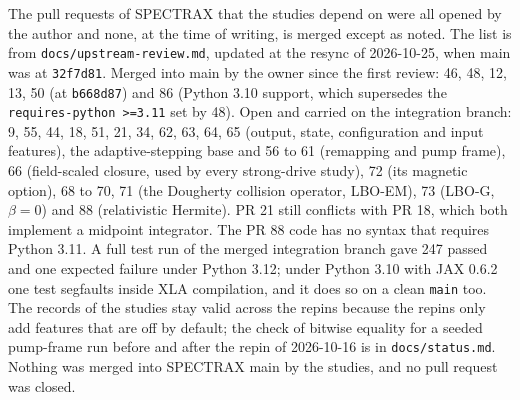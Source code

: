 The pull requests of SPECTRAX that the studies depend on were all opened by the author and none, at the time of writing, is merged except as noted. The list is from \texttt{docs/upstream-review.md}, updated at the resync of 2026-10-25, when main was at \texttt{32f7d81}. Merged into main by the owner since the first review: 46, 48, 12, 13, 50 (at \texttt{b668d87}) and 86 (Python 3.10 support, which supersedes the \texttt{requires-python >=3.11} set by 48). Open and carried on the integration branch: 9, 55, 44, 18, 51, 21, 34, 62, 63, 64, 65 (output, state, configuration and input features), the adaptive-stepping base and 56 to 61 (remapping and pump frame), 66 (field-scaled closure, used by every strong-drive study), 72 (its magnetic option), 68 to 70, 71 (the Dougherty collision operator, LBO-EM), 73 (LBO-G, $\beta=0$) and 88 (relativistic Hermite). PR 21 still conflicts with PR 18, which both implement a midpoint integrator. The PR 88 code has no syntax that requires Python 3.11. A full test run of the merged integration branch gave 247 passed and one expected failure under Python 3.12; under Python 3.10 with JAX 0.6.2 one test segfaults inside XLA compilation, and it does so on a clean \texttt{main} too. The records of the studies stay valid across the repins because the repins only add features that are off by default; the check of bitwise equality for a seeded pump-frame run before and after the repin of 2026-10-16 is in \texttt{docs/status.md}. Nothing was merged into SPECTRAX main by the studies, and no pull request was closed.
